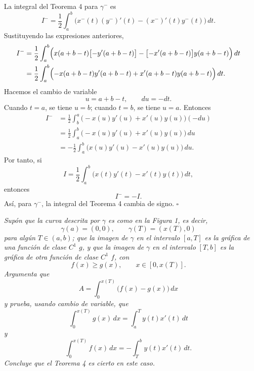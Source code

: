 \documentclass[11pt,letterpaper]{article}
\begin{document}
La integral del Teorema 4 para $\gamma^-$ es
\begin{equation*}
    I^-=\frac12\int_a^b\bigl(x^-(t)(y^-)'(t)-(x^-)'(t)y^-(t)\bigr)\,dt.
\end{equation*}
Sustituyendo las expresiones anteriores,
\begin{align*}
    I^-
    &=\frac12\int_a^b\Bigl(x(a+b-t)\bigl[-y'(a+b-t)\bigr]
    -\bigl[-x'(a+b-t)\bigr]y(a+b-t)\Bigr)\,dt \\
    &=\frac12\int_a^b\Bigl(-x(a+b-t)y'(a+b-t)
    +x'(a+b-t)y(a+b-t)\Bigr)\,dt.
\end{align*}
Hacemos el cambio de variable
\begin{equation*}
    u=a+b-t,
    \qquad du=-dt.
\end{equation*}
Cuando $t=a$, se tiene $u=b$; cuando $t=b$, se tiene $u=a$. Entonces
\begin{align*}
    I^-
    &=\frac12\int_b^a\bigl(-x(u)y'(u)+x'(u)y(u)\bigr)(-du) \\
    &=\frac12\int_a^b\bigl(-x(u)y'(u)+x'(u)y(u)\bigr)\,du \\
    &=-\frac12\int_a^b\bigl(x(u)y'(u)-x'(u)y(u)\bigr)\,du.
\end{align*}
Por tanto, si
\begin{equation*}
    I=\frac12\int_a^b\bigl(x(t)y'(t)-x'(t)y(t)\bigr)\,dt,
\end{equation*}
entonces
\begin{equation*}
    I^-=-I.
\end{equation*}
Así, para $\gamma^-$, la integral del Teorema 4 cambia de signo.
\hfill $\square$


\newpage

\begin{tcolorbox}[title=\textcolor{white}{Problema 21}]
\textit{Supón que la curva descrita por $\gamma$ es como en la Figura 1, es decir,}
\begin{equation*}
    \gamma(a)=(0,0),
    \qquad
    \gamma(T)=(x(T),0)
\end{equation*}
\textit{para algún $T\in(a,b)$; que la imagen de $\gamma$ en el intervalo $[a,T]$ es la gráfica de una función de clase $C^1$ $g$, y que la imagen de $\gamma$ en el intervalo $[T,b]$ es la gráfica de otra función de clase $C^1$ $f$, con}
\begin{equation*}
    f(x)\geq g(x),
    \qquad
    x\in[0,x(T)].
\end{equation*}
\textit{Argumenta que}
\begin{equation*}
    A=\int_0^{x(T)}\bigl(f(x)-g(x)\bigr)\,dx
\end{equation*}
\textit{y prueba, usando cambio de variable, que}
\begin{equation*}
    \int_0^{x(T)}g(x)\,dx
    =
    \int_a^T y(t)x'(t)\,dt
\end{equation*}
\textit{y}
\begin{equation*}
    \int_0^{x(T)}f(x)\,dx
    =
    -\int_T^b y(t)x'(t)\,dt.
\end{equation*}
\textit{Concluye que el Teorema 4 es cierto en este caso.}
\end{tcolorbox}
\end{document}

